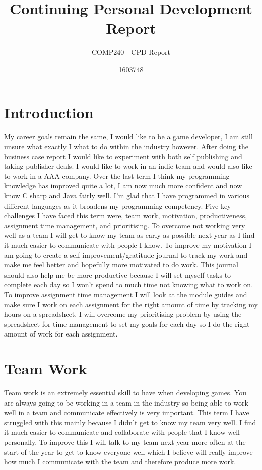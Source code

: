 \documentclass{scrartcl}
\title{Continuing Personal Development Report}
\subtitle{COMP240 - CPD Report}
\author{1603748}
\begin{document}
\maketitle

\section*{Introduction}
My career goals remain the same, I would like to be a game developer, I am still unsure what exactly I what to do within the industry however. After doing the business case report I would like to experiment with both self publishing and taking publisher deals. I would like to work in an indie team and would also like to work in a AAA company. Over the last term I think my programming knowledge has improved quite a lot, I am now much more confident and now know C sharp and Java fairly well. I'm glad that I have programmed in various different languages as it broadens my programming competency. Five key challenges I have faced this term were, team work, motivation, productiveness, assignment time management, and prioritising. To overcome not working very well as a team I will get to know my team as early as possible next year as I find it much easier to communicate with people I know. To improve my motivation I am going to create a self improvement/gratitude journal to track my work and make me feel better and hopefully more motivated to do work. This journal should also help me be more productive because I will set myself tasks to complete each day so I won't spend to much time not knowing what to work on. To improve assignment time management I will look at the module guides and make sure I work on each assignment for the right amount of time by tracking my hours on a spreadsheet. I will overcome my prioritising problem by using the spreadsheet for time management to set my goals for each day so I do the right amount of work for each assignment. 

\section{Team Work}
Team work is an extremely essential skill to have when developing games. You are always going to be working in a team in the industry so being able to work well in a team and communicate effectively is very important. This term I have struggled with this mainly because I didn't get to know my team very well. I find it much easier to communicate and collaborate with people that I know well personally. To improve this I will talk to my team next year more often at the start of the year to get to know everyone well which I believe will really improve how much I communicate with the team and therefore produce more work. 
\end{document}
